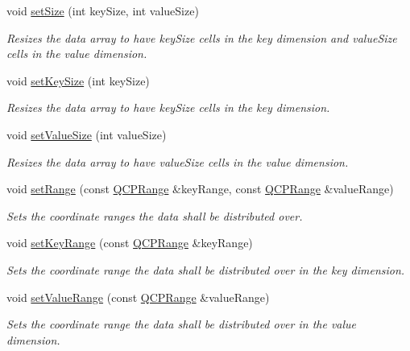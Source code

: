 \begin{DoxyCompactItemize}
\item 
void \hyperlink{classQCPColorMapData_a0d9ff35c299d0478b682bfbcdd9c097e}{set\+Size} (int key\+Size, int value\+Size)
\begin{DoxyCompactList}\small\item\em Resizes the data array to have {\itshape key\+Size} cells in the key dimension and {\itshape value\+Size} cells in the value dimension. \end{DoxyCompactList}\item 
void \hyperlink{classQCPColorMapData_ac7ef70e383aface34b44dbde49234b6b}{set\+Key\+Size} (int key\+Size)
\begin{DoxyCompactList}\small\item\em Resizes the data array to have {\itshape key\+Size} cells in the key dimension. \end{DoxyCompactList}\item 
void \hyperlink{classQCPColorMapData_a0893c9e3914513048b45e3429ffd16f2}{set\+Value\+Size} (int value\+Size)
\begin{DoxyCompactList}\small\item\em Resizes the data array to have {\itshape value\+Size} cells in the value dimension. \end{DoxyCompactList}\item 
void \hyperlink{classQCPColorMapData_aad9c1c7c703c1339489fc730517c83d4}{set\+Range} (const \hyperlink{classQCPRange}{Q\+C\+P\+Range} \&key\+Range, const \hyperlink{classQCPRange}{Q\+C\+P\+Range} \&value\+Range)
\begin{DoxyCompactList}\small\item\em Sets the coordinate ranges the data shall be distributed over. \end{DoxyCompactList}\item 
void \hyperlink{classQCPColorMapData_a0738c485f3c9df9ea1241b7a8bb6a86e}{set\+Key\+Range} (const \hyperlink{classQCPRange}{Q\+C\+P\+Range} \&key\+Range)
\begin{DoxyCompactList}\small\item\em Sets the coordinate range the data shall be distributed over in the key dimension. \end{DoxyCompactList}\item 
void \hyperlink{classQCPColorMapData_ada1b2680ba96a5f4175b6d341cf75d23}{set\+Value\+Range} (const \hyperlink{classQCPRange}{Q\+C\+P\+Range} \&value\+Range)
\begin{DoxyCompactList}\small\item\em Sets the coordinate range the data shall be distributed over in the value dimension. \end{DoxyCompactList}\item 

\end{DoxyCompactItemize}

